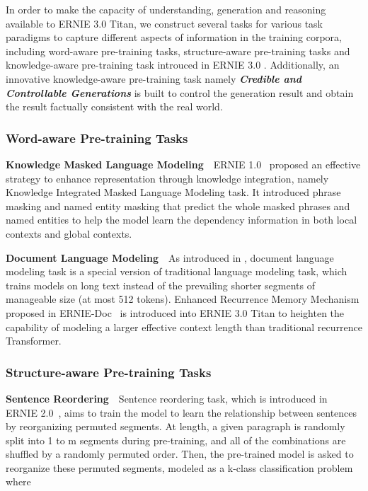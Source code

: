 In order to make the capacity of understanding, generation and reasoning available to ERNIE 3.0 Titan, we construct several tasks for various task paradigms to capture different aspects of information in the training corpora, including word-aware pre-training tasks, structure-aware pre-training tasks and knowledge-aware pre-training task introuced in ERNIE 3.0 \cite{sun2021ernie}. Additionally, an innovative knowledge-aware pre-training task namely \textbf{\textit{Credible and Controllable Generations}} is built to control the generation result and obtain the result factually consistent with the real world.

\subsubsection{Word-aware Pre-training Tasks}\label{sec:Word-aware pretrain-task}

\textbf{Knowledge Masked Language Modeling} \,\, 
ERNIE 1.0~\cite{sun2019ernie} proposed an effective strategy to enhance representation through knowledge integration, namely Knowledge Integrated Masked Language Modeling task. It introduced phrase masking and named entity masking that predict the whole masked phrases and named entities to help the model learn the dependency information in both local contexts and global contexts. 

\textbf{Document Language Modeling} \,\, 
As introduced in \cite{sun2021ernie}, document language modeling task is a special version of traditional language modeling task, which trains models on long text instead of the prevailing shorter segments of manageable size (at most 512 tokens). Enhanced Recurrence Memory Mechanism proposed in ERNIE-Doc~\cite{ding2020ernie} is introduced into ERNIE 3.0 Titan to heighten the capability of modeling a larger effective context length than traditional recurrence Transformer. 

\subsubsection{Structure-aware Pre-training Tasks}\label{sec:Structure-aware pretrain-task}
\textbf{Sentence Reordering} \,\, 
Sentence reordering task, which is introduced in ERNIE 2.0~\cite{sun2020ernie}, aims to train the model to learn the relationship between sentences by reorganizing permuted segments. At length, a given paragraph is randomly split into 1 to m segments during pre-training, and all of the combinations are shuffled by a randomly permuted order. Then, the pre-trained model is asked to reorganize these permuted segments, modeled as a k-class classification problem where

